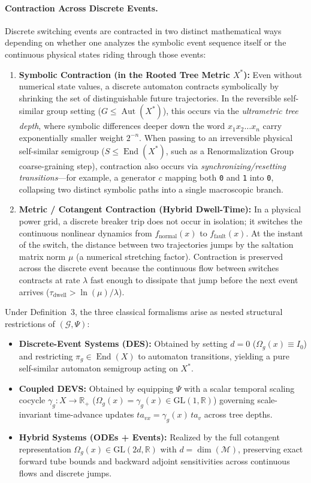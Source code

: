 \documentclass[journal]{IEEEtran}
\begin{document}
\paragraph{Contraction Across Discrete Events.}
Discrete switching events are contracted in two distinct mathematical ways depending on whether one analyzes the symbolic event sequence itself or the continuous physical states riding through those events:
\begin{enumerate}
    \item \textbf{Symbolic Contraction (in the Rooted Tree Metric $X^*$):} Even without numerical state values, a discrete automaton contracts symbolically by shrinking the set of distinguishable future trajectories. In the reversible self-similar group setting ($G \le \operatorname{Aut}(X^*)$), this occurs via the \emph{ultrametric tree depth}, where symbolic differences deeper down the word $x_1 x_2 \dots x_n$ carry exponentially smaller weight $2^{-n}$. When passing to an irreversible physical self-similar semigroup ($S \le \operatorname{End}(X^*)$, such as a Renormalization Group coarse-graining step), contraction also occurs via \emph{synchronizing/resetting transitions}---for example, a generator $c$ mapping both \texttt{0} and \texttt{1} into \texttt{0}, collapsing two distinct symbolic paths into a single macroscopic branch.
    \item \textbf{Metric / Cotangent Contraction (Hybrid Dwell-Time):} In a physical power grid, a discrete breaker trip does not occur in isolation; it switches the continuous nonlinear dynamics from $f_{\mathrm{normal}}(x)$ to $f_{\mathrm{fault}}(x)$. At the instant of the switch, the distance between two trajectories jumps by the saltation matrix norm $\mu$ (a numerical stretching factor). Contraction is preserved across the discrete event because the continuous flow between switches contracts at rate $\lambda$ fast enough to dissipate that jump before the next event arrives ($\tau_{\mathrm{dwell}} > \ln(\mu)/\lambda$).
\end{enumerate}

Under Definition~3, the three classical formalisms arise as nested structural restrictions of $(\mathcal{G}, \Psi)$:
\begin{itemize}
    \item \textbf{Discrete-Event Systems (DES):} Obtained by setting $d = 0$ ($\Omega_g(x) \equiv I_0$) and restricting $\pi_g \in \operatorname{End}(X)$ to automaton transitions, yielding a pure self-similar automaton semigroup acting on $X^*$.
    \item \textbf{Coupled DEVS:} Obtained by equipping $\Psi$ with a scalar temporal scaling cocycle $\gamma_g : X \to \mathbb{R}_+$ ($\Omega_g(x) = \gamma_g(x) \in \mathrm{GL}(1, \mathbb{R})$) governing scale-invariant time-advance updates $ta_{vx} = \gamma_g(x)\, ta_v$ across tree depths.
    \item \textbf{Hybrid Systems (ODEs + Events):} Realized by the full cotangent representation $\Omega_g(x) \in \mathrm{GL}(2d, \mathbb{R})$ with $d = \dim(\mathcal{M})$, preserving exact forward tube bounds and backward adjoint sensitivities across continuous flows and discrete jumps.
\end{itemize}
\end{document}
